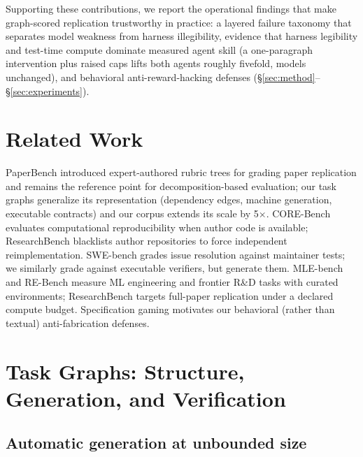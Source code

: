 \documentclass{article}
\begin{document}
Supporting these contributions, we report the operational findings that make
graph-scored replication trustworthy in practice: a layered failure taxonomy
that separates model weakness from harness illegibility, evidence that
harness legibility and test-time compute dominate measured agent skill
(a one-paragraph intervention plus raised caps lifts both agents roughly
fivefold, models unchanged), and behavioral anti-reward-hacking defenses
(\S\ref{sec:method}--\S\ref{sec:experiments}).

\section{Related Work}

PaperBench \citep{starace2025paperbench} introduced expert-authored rubric
trees for grading paper replication and remains the reference point for
decomposition-based evaluation; our task graphs generalize its representation
(dependency edges, machine generation, executable contracts) and our corpus
extends its scale by 5$\times$. CORE-Bench \citep{siegel2024core} evaluates
computational reproducibility when author code is available; ResearchBench
blacklists author repositories to force independent reimplementation.
SWE-bench \citep{jimenez2024swebench} grades issue resolution against
maintainer tests; we similarly grade against executable verifiers, but
generate them. MLE-bench \citep{chan2024mlebench} and RE-Bench
\citep{wijk2024rebench} measure ML engineering and frontier R\&D tasks with
curated environments; ResearchBench targets full-paper replication under a
declared compute budget. Specification gaming \citep{krakovna2020specification}
motivates our behavioral (rather than textual) anti-fabrication defenses.

\section{Task Graphs: Structure, Generation, and Verification}
\label{sec:graphs}

\subsection{Automatic generation at unbounded size}
\end{document}
